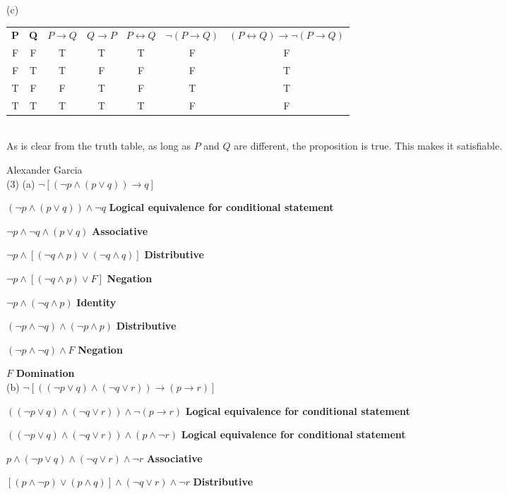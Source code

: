 \documentclass[]{article}
\def\OR{\vee}
\def\AND{\wedge}
\def\imp{\rightarrow}
\begin{document}
(c)
\begin{tabular}{c c | c c c c | c}
	\textbf{P} & \textbf{Q} & 
	$P \imp Q$ & $Q \imp P$ & $P \leftrightarrow Q$ & $\neg(P \imp Q)$ & 
	$(P \leftrightarrow Q) \imp \neg(P \imp Q)$ \\
	F & F & T & T & T & F & F \\
	F & T & T & F & F & F & T \\
	T & F & F & T & F & T & T \\
	T & T & T & T & T & F & F \\
\end{tabular} \\

As is clear from the truth table, as long as $P$ and $Q$ are different, the proposition is true. This makes it satisfiable. \\
\newpage

Alexander Garcia\\

\noindent (3)
(a)
$\neg[(\neg p \AND (p \OR q)) \imp q]$

$(\neg p \AND (p \OR q)) \AND \neg q$ \textbf{Logical equivalence for conditional statement}

$\neg p \AND \neg q \AND (p \OR q)$ \textbf{Associative}

$\neg p \AND [(\neg q \AND p) \OR (\neg q \AND q)]$ \textbf{Distributive}

$\neg p \AND [(\neg q \AND p) \OR F]$ \textbf{Negation}

$\neg p \AND (\neg q \AND p)$ \textbf{Identity}

$(\neg p \AND \neg q) \AND (\neg p \AND p)$ \textbf{Distributive}

$(\neg p \AND \neg q) \AND F$ \textbf{Negation}

$F$ \textbf{Domination}\\

(b) $\neg [((\neg p \OR q) \AND (\neg q \OR r)) \imp (p \imp r)]$

$((\neg p \OR q) \AND (\neg q \OR r)) \AND \neg(p \imp r)$ \textbf{Logical equivalence for conditional statement}

$((\neg p \OR q) \AND (\neg q \OR r)) \AND (p \AND \neg r)$ \textbf{Logical equivalence for conditional statement}

$p \AND (\neg p \OR q) \AND (\neg q \OR r) \AND \neg r$ \textbf{Associative}

$[(p \AND \neg p) \OR (p \AND q)] \AND (\neg q \OR r) \AND \neg r$ \textbf{Distributive}
\end{document}

